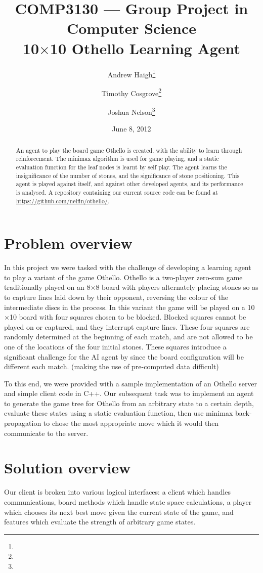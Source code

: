 \documentclass[11pt]{article}
\title{%
  COMP3130 --- Group Project in Computer Science \\
  10$\times$10 Othello Learning Agent}
\date{June 8, 2012}
\author{%
  Andrew Haigh\thanks{\uid{u4667010}} \and %
  Timothy Cosgrove\thanks{\uid{u4843619}} \and
  Joshua Nelson\thanks{\uid{u4850020}}}
\begin{document}
\maketitle
\begin{abstract}
  \label{abstract}
  An agent to play the board game Othello is created, with the ability
  to learn through reinforcement. The minimax algorithm is used for game
  playing, and a static evaluation function for the leaf nodes is learnt by
  self play.  The agent learns the insignificance of the number of stones, and
  the significance of stone positioning. This agent is played against itself,
  and against other developed agents, and its performance is analysed.
  A repository containing our current source code can be found at
  \url{https://github.com/nelfin/othello/}.
\end{abstract}
\clearpage

\section{Problem overview}
\label{sec:problem_overview}
In this project we were tasked with the challenge of developing a learning
agent to play a variant of the game Othello. Othello is a two-player zero-sum
game traditionally played on an 8$\times$8 board with players alternately
placing stones so as to capture lines laid down by their opponent, reversing
the colour of the intermediate discs in the process.
In this variant the game will be played on a 10$\times$10 board with four
squares chosen to be blocked. Blocked squares cannot be played on or captured,
and they interrupt capture lines. These four squares are randomly determined at
the beginning of each match, and are not allowed to be one of the
locations of the four initial stones. These squares introduce a significant challenge
for the AI agent by since the board configuration will be different each match.
(making the use of pre-computed data difficult)

To this end, we were provided with a sample implementation of an Othello
server and simple client code in C++. Our subsequent task was to implement an
agent to generate the game tree for Othello from an arbitrary state to a
certain depth, evaluate these states using a static evaluation function, then
use minimax back-propagation to chose the most appropriate move which it would
then communicate to the server.

\section{Solution overview}
\label{sec:solution_overview}
Our client is broken into various logical interfaces: a client which handles
communications, board methods which handle state space calculations, a player
which chooses its next best move given the current state of the game, and
features which evaluate the strength of arbitrary game states.
\end{document}
